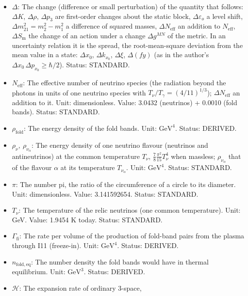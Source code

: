 \documentclass[
  10pt,
]{article}
\providecommand{\tightlist}{%
  \setlength{\itemsep}{0pt}\setlength{\parskip}{0pt}}
\begin{document}
\begin{itemize}
\tightlist
\item
  \(\Delta\): The change (difference or small perturbation) of the
  quantity that follows: \(\Delta K\), \(\Delta\rho\), \(\Delta p_3\)
  are first-order changes about the static block,
  \(\Delta\varepsilon_o\) a level shift,
  \(\Delta m^2_{21} = m_2^2 - m_1^2\) a difference of squared masses,
  \(\Delta N_{\mathrm{eff}}\) an addition to \(N_{\mathrm{eff}}\),
  \(\Delta S_{\mathrm{m}}\) the change of an action under a change
  \(\Delta g^{MN}\) of the metric. In an uncertainty relation it is the
  spread, the root-mean-square deviation from the mean value in a state:
  \(\Delta x_0\), \(\Delta k_{x_0}\), \(\Delta\xi\), \(\Delta(fy)\) (as
  in the author's \(\Delta x_0\,\Delta p_{x_0} \ge \hbar/2\)). Status:
  STANDARD.
\item
  \(N_{\mathrm{eff}}\): The effective number of neutrino species (the
  radiation beyond the photons in units of one neutrino species with
  \(T_\nu/T_\gamma = (4/11)^{1/3}\)); \(\Delta N_{\mathrm{eff}}\) an
  addition to it. Unit: dimensionless. Value: 3.0432 (neutrinos) +
  0.0010 (fold bands). Status: STANDARD.
\item
  \(\rho_{\mathrm{fold}}\): The energy density of the fold bands. Unit:
  \(\mathrm{GeV}^{4}\). Status: DERIVED.
\item
  \(\rho_\nu,\ \rho_{\nu_\alpha}\): The energy density of one neutrino
  flavour (neutrinos and antineutrinos) at the common temperature
  \(T_\nu\), \(\frac78\frac{\pi^2}{15}T_\nu^4\) when massless;
  \(\rho_{\nu_\alpha}\) that of the flavour \(\alpha\) at its
  temperature \(T_{\nu_\alpha}\). Unit: \(\mathrm{GeV}^{4}\). Status:
  STANDARD.
\item
  \(\pi\): The number pi, the ratio of the circumference of a circle to
  its diameter. Unit: dimensionless. Value: 3.141592654. Status:
  STANDARD.
\item
  \(T_\nu\): The temperature of the relic neutrinos (one common
  temperature). Unit: GeV. Value: 1.9454 K today. Status: STANDARD.
\item
  \(\Gamma_{\mathrm{fi}}\): The rate per volume of the production of
  fold-band pairs from the plasma through I11 (freeze-in). Unit:
  \(\mathrm{GeV}^{4}\). Status: DERIVED.
\item
  \(n_{\mathrm{fold,eq}}\): The number density the fold bands would have
  in thermal equilibrium. Unit: \(\mathrm{GeV}^{3}\). Status: DERIVED.
\item
  \(\mathcal{H}\): The expansion rate of ordinary 3-space,

\end{itemize}
\end{document}
